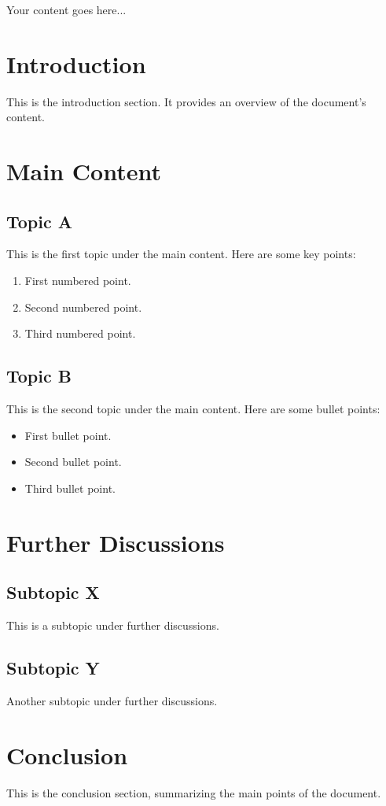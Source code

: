\documentclass[12pt, letterpaper]{article}
\begin{document}
Your content goes here...

\section{Introduction}
This is the introduction section. It provides an overview of the document's content.

\section{Main Content}
\subsection{Topic A}
This is the first topic under the main content. Here are some key points:
\begin{enumerate}
    \item First numbered point.
    \item Second numbered point.
    \item Third numbered point.
\end{enumerate}

\subsection{Topic B}
This is the second topic under the main content. Here are some bullet points:
\begin{itemize}
    \item First bullet point.
    \item Second bullet point.
    \item Third bullet point.
\end{itemize}

\section{Further Discussions}
\subsection{Subtopic X}
This is a subtopic under further discussions.

\subsection{Subtopic Y}
Another subtopic under further discussions.

\section{Conclusion}
This is the conclusion section, summarizing the main points of the document.
\end{document}
